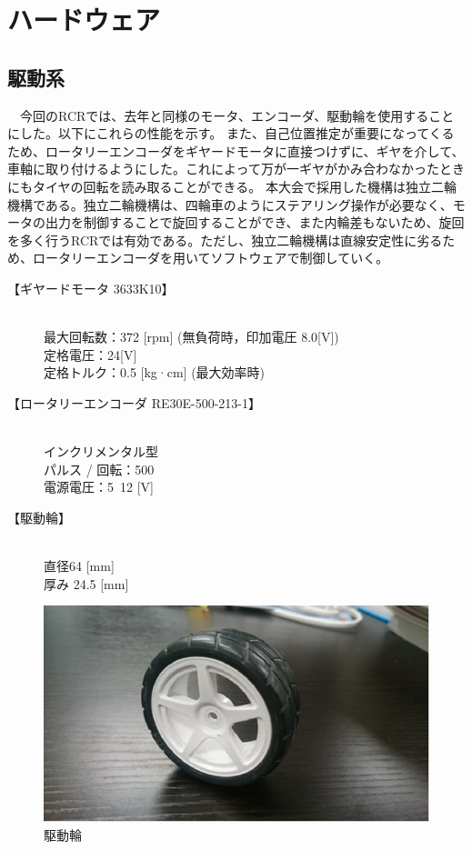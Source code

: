 \section{ハードウェア}
\subsection{駆動系}
　今回のRCRでは、去年と同様のモータ、エンコーダ、駆動輪を使用することにした。以下にこれらの性能を示す。
また、自己位置推定が重要になってくるため、ロータリーエンコーダをギヤードモータに直接つけずに、ギヤを介して、車軸に取り付けるようにした。これによって万が一ギヤがかみ合わなかったときにもタイヤの回転を読み取ることができる。
本大会で採用した機構は独立二輪機構である。独立二輪機構は、四輪車のようにステアリング操作が必要なく、モータの出力を制御することで旋回することができ、また内輪差もないため、旋回を多く行うRCRでは有効である。ただし、独立二輪機構は直線安定性に劣るため、ロータリーエンコーダを用いてソフトウェアで制御していく。

\begin{description}
 \item[【ギヤードモータ 3633K10】] \mbox{} \\ 
	    最大回転数：372 [rpm] (無負荷時，印加電圧 8.0[V]) \\
	    定格電圧：24[V] \\
	    定格トルク：0.5 [kg·cm] (最大効率時)        
 \item[【ロータリーエンコーダ RE30E-500-213-1】] \mbox{} \\
	    インクリメンタル型 \\
	    パルス / 回転：500 \\
	    電源電圧：5~12 [V] 
 \item[【駆動輪】] \mbox{} \\
	    直径64 [mm] \\
	    厚み 24.5 [mm]
\end{description}


\begin{figure}[b]
 \begin{center}
  \includegraphics[scale=.5]{../kuwano/picture/picture1.eps}
  \caption{駆動輪}
 \end{center}
\end{figure}



